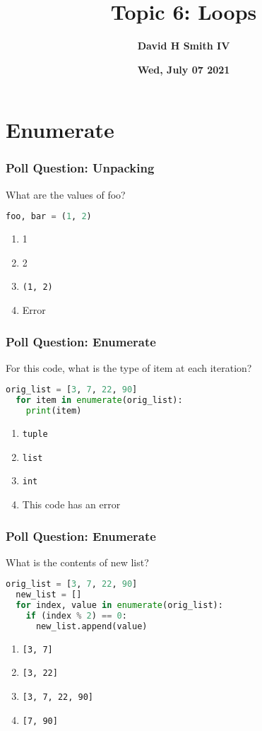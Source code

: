 \documentclass{beamer}
\title{\textbf{Topic 6: Loops}}
\author{\textbf{David H Smith IV}}
\institute[\textbf{UIUC}]{\textbf{University of Illinois Urbana-Champaign}}
\date{\textbf{Wed, July 07 2021}}
\begin{document}
\frame{\titlepage}

\section{Enumerate}

%
%
\begin{frame}[fragile]
  \frametitle{Poll Question: Unpacking}
  What are the values of foo?
  \begin{lstlisting}[language=Python, autogobble]
  foo, bar = (1, 2)
  \end{lstlisting}
  \vfill
  \begin{enumerate}[A]
    \item 1
    \item 2
    \item \lstinline|(1, 2)|
    \item Error
  \end{enumerate}
\end{frame}

%
%
\begin{frame}[fragile]
  \frametitle{Poll Question: Enumerate}
  For this code, what is the type of item at each iteration?
  \begin{lstlisting}[language=Python, autogobble]
  orig_list = [3, 7, 22, 90]
  for item in enumerate(orig_list):
    print(item)
  \end{lstlisting}
  \vfill
  \begin{enumerate}[A]
    \item \lstinline|tuple|
    \item \lstinline|list|
    \item \lstinline|int|
    \item This code has an error
  \end{enumerate}
\end{frame}



%
%
\begin{frame}[fragile]
  \frametitle{Poll Question: Enumerate}
  What is the contents of new list?
  \begin{lstlisting}[language=Python, autogobble]
  orig_list = [3, 7, 22, 90]
  new_list = []
  for index, value in enumerate(orig_list):
    if (index % 2) == 0:
      new_list.append(value)
  \end{lstlisting}
  \vfill
  \begin{enumerate}[A]
    \item \lstinline|[3, 7]|
    \item \lstinline|[3, 22]|
    \item \lstinline|[3, 7, 22, 90]|
    \item \lstinline|[7, 90]|
  \end{enumerate}
\end{frame}
\end{document}
